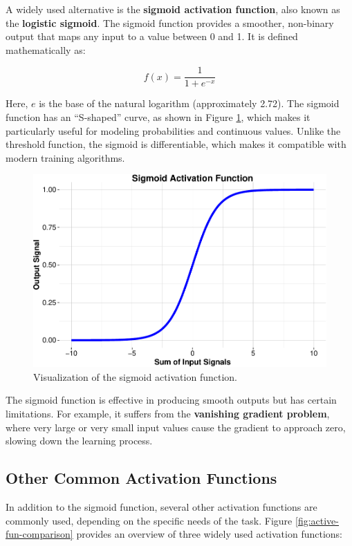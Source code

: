 \documentclass[
]{book}
\theoremstyle{definition}
\theoremstyle{definition}
\theoremstyle{definition}
\theoremstyle{definition}
\theoremstyle{remark}
\begin{document}
A widely used alternative is the \textbf{sigmoid activation function}, also known as the \textbf{logistic sigmoid}. The sigmoid function provides a smoother, non-binary output that maps any input to a value between 0 and 1. It is defined mathematically as:

\[
f(x) = \frac{1}{1 + e^{-x}}
\]

Here, \(e\) is the base of the natural logarithm (approximately 2.72). The sigmoid function has an ``S-shaped'' curve, as shown in Figure \ref{fig:active-fun-sigmoid}, which makes it particularly useful for modeling probabilities and continuous values. Unlike the threshold function, the sigmoid is differentiable, which makes it compatible with modern training algorithms.

\begin{figure}

{\centering \includegraphics[width=0.5\linewidth]{nn_files/figure-latex/active-fun-sigmoid-1} 

}

\caption{Visualization of the sigmoid activation function.}\label{fig:active-fun-sigmoid}
\end{figure}

The sigmoid function is effective in producing smooth outputs but has certain limitations. For example, it suffers from the \textbf{vanishing gradient problem}, where very large or very small input values cause the gradient to approach zero, slowing down the learning process.

\subsection*{Other Common Activation Functions}\label{other-common-activation-functions}

In addition to the sigmoid function, several other activation functions are commonly used, depending on the specific needs of the task. Figure \ref{fig:active-fun-comparison} provides an overview of three widely used activation functions:
\end{document}
